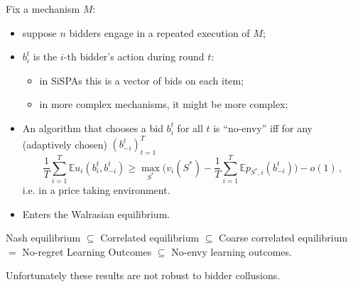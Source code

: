 \documentclass[a4paper]{article}
\newcommand{\ex}{\mathbb{E}}
\begin{document}
Fix a mechanism $M$: \begin{itemize}
	\item suppose $n$ bidders engage in a repeated execution of $M$;
	\item $b_i^t$ is the $i$-th bidder's action during round $t$: \begin{itemize}
		\item in SiSPAs this is a vector of bids on each item;
		\item in more complex mechanisms, it might be more complex;
	\end{itemize}
	\item An algorithm that chooses a bid $b_i^t$ for all $t$ is ``no-envy'' iff
	for any (adaptively chosen) $(b_{-i}^t)_{t=1}^T$
	\begin{equation}
		\frac{1}{T} \sum_{i=1}^T \ex u_i(b_i^t, b_{-i}^t)
			\geq \max_{S^*} \bigl(v_i(S^*) - \frac{1}{T} \sum_{i=1}^T \ex p_{S^*,i}(b_{-i}^t) \bigr)
			- o(1) \,,
	\end{equation}
	i.e. in a price taking environment.
	\item Enters the Walrasian equilibrium.
\end{itemize}

Nash equilibrium $\subseteq$
Correlated equilibrium $\subseteq$
Coarse correlated equilibrium $=$
No-regret Learning Outcomes $\subseteq$
No-envy learning outcomes.

Unfortunately these results are not robust to bidder collusions.

\end{document}
